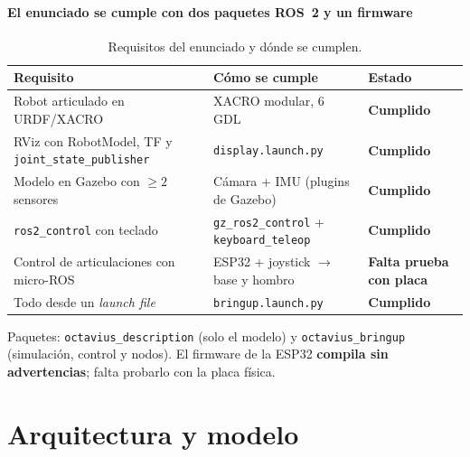 \begin{frame}{\insertsectionhead}
  \framesubtitle{El enunciado se cumple con dos paquetes ROS~2 y un firmware}
  \begin{table}
    \centering
    \caption{Requisitos del enunciado y dónde se cumplen.}
    \scriptsize
    \begin{tabular}{@{} l l l @{}}
      \toprule
      \textbf{Requisito} & \textbf{Cómo se cumple} & \textbf{Estado} \\
      \midrule
      Robot articulado en URDF/XACRO & XACRO modular, 6 GDL & \color{tAccent}\textbf{Cumplido} \\
      RViz con RobotModel, TF y \texttt{joint\_state\_publisher} & \texttt{display.launch.py} & \color{tAccent}\textbf{Cumplido} \\
      Modelo en Gazebo con $\geq 2$ sensores & Cámara + IMU (plugins de Gazebo) & \color{tAccent}\textbf{Cumplido} \\
      \texttt{ros2\_control} con teclado & \texttt{gz\_ros2\_control} + \texttt{keyboard\_teleop} & \color{tAccent}\textbf{Cumplido} \\
      Control de articulaciones con micro-ROS & ESP32 + joystick $\rightarrow$ base y hombro & \color{tPrim}\textbf{Falta prueba con placa} \\
      Todo desde un \textit{launch file} & \texttt{bringup.launch.py} & \color{tAccent}\textbf{Cumplido} \\
      \bottomrule
    \end{tabular}
  \end{table}
  \vfill
  {\small Paquetes: \texttt{octavius\_description} (solo el modelo) y \texttt{octavius\_bringup} (simulación, control y nodos). El firmware de la ESP32 \textbf{compila sin advertencias}; falta probarlo con la placa física.}
\end{frame}


\section{Arquitectura y modelo}
